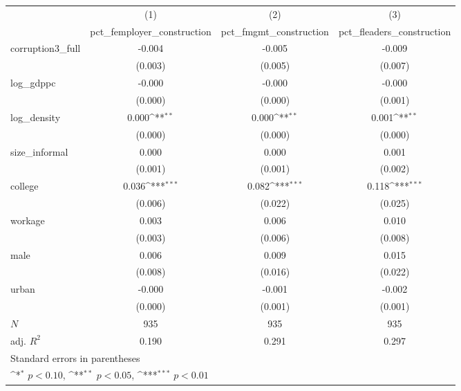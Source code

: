 {
\def\sym#1{\ifmmode^{#1}\else\(^{#1}\)\fi}
\begin{tabular}{l*{3}{c}}
\hline\hline
            &\multicolumn{1}{c}{(1)}&\multicolumn{1}{c}{(2)}&\multicolumn{1}{c}{(3)}\\
            &\multicolumn{1}{c}{pct\_femployer\_construction}&\multicolumn{1}{c}{pct\_fmgmt\_construction}&\multicolumn{1}{c}{pct\_fleaders\_construction}\\
\hline
corruption3\_full&      -0.004         &      -0.005         &      -0.009         \\
            &     (0.003)         &     (0.005)         &     (0.007)         \\
[1em]
log\_gdppc   &      -0.000         &      -0.000         &      -0.000         \\
            &     (0.000)         &     (0.000)         &     (0.001)         \\
[1em]
log\_density &       0.000\sym{**} &       0.000\sym{**} &       0.001\sym{**} \\
            &     (0.000)         &     (0.000)         &     (0.000)         \\
[1em]
size\_informal&       0.000         &       0.000         &       0.001         \\
            &     (0.001)         &     (0.001)         &     (0.002)         \\
[1em]
college     &       0.036\sym{***}&       0.082\sym{***}&       0.118\sym{***}\\
            &     (0.006)         &     (0.022)         &     (0.025)         \\
[1em]
workage     &       0.003         &       0.006         &       0.010         \\
            &     (0.003)         &     (0.006)         &     (0.008)         \\
[1em]
male        &       0.006         &       0.009         &       0.015         \\
            &     (0.008)         &     (0.016)         &     (0.022)         \\
[1em]
urban       &      -0.000         &      -0.001         &      -0.002         \\
            &     (0.000)         &     (0.001)         &     (0.001)         \\
\hline
\(N\)       &         935         &         935         &         935         \\
adj. \(R^{2}\)&       0.190         &       0.291         &       0.297         \\
\hline\hline
\multicolumn{4}{l}{\footnotesize Standard errors in parentheses}\\
\multicolumn{4}{l}{\footnotesize \sym{*} \(p<0.10\), \sym{**} \(p<0.05\), \sym{***} \(p<0.01\)}\\
\end{tabular}
}
